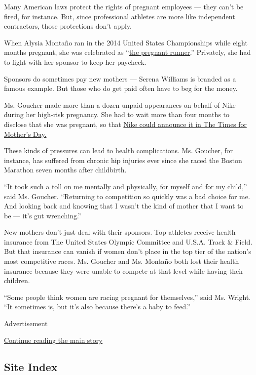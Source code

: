 Many American laws protect the rights of pregnant employees --- they
can't be fired, for instance. But, since professional athletes are more
like independent contractors, those protections don't apply.

When Alysia Montaño ran in the 2014 United States Championships while
eight months pregnant, she was celebrated as
``\href{https://www.flotrack.org/articles/5067150-that-pregnant-runner-alysia-montano-runs-221-in-usa-800-prelims}{the
pregnant runner}.'' Privately, she had to fight with her sponsor to keep
her paycheck.

Sponsors do sometimes pay new mothers --- Serena Williams is branded as
a famous example. But those who do get paid often have to beg for the
money.

Ms. Goucher made more than a dozen unpaid appearances on behalf of Nike
during her high-risk pregnancy. She had to wait more than four months to
disclose that she was pregnant, so that
\href{https://www.nytimes3xbfgragh.onion/2010/05/09/sports/09marathon.html}{Nike
could announce it in The Times for Mother's Day.}

These kinds of pressures can lead to health complications. Ms. Goucher,
for instance, has suffered from chronic hip injuries ever since she
raced the Boston Marathon seven months after childbirth.

``It took such a toll on me mentally and physically, for myself and for
my child,'' said Ms. Goucher. ``Returning to competition so quickly was
a bad choice for me. And looking back and knowing that I wasn't the kind
of mother that I want to be --- it's gut wrenching.''

New mothers don't just deal with their sponsors. Top athletes receive
health insurance from The United States Olympic Committee and U.S.A.
Track \& Field. But that insurance can vanish if women don't place in
the top tier of the nation's most competitive races. Ms. Goucher and Ms.
Montaño both lost their health insurance because they were unable to
compete at that level while having their children.

``Some people think women are racing pregnant for themselves,'' said Ms.
Wright. ``It sometimes is, but it's also because there's a baby to
feed.''

Advertisement

\protect\hyperlink{after-bottom}{Continue reading the main story}

\hypertarget{site-index}{%
\subsection{Site Index}\label{site-index}}

